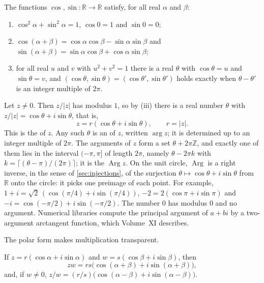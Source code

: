 \begin{assumption}
\label{asm:trig}
The functions $\cos,\sin\colon\mathbb R\to\mathbb R$ satisfy, for all real $\alpha$ and $\beta$:
\begin{enumerate}
\item $\cos^2\alpha+\sin^2\alpha=1$, $\cos0=1$ and $\sin0=0$;
\item $\cos(\alpha+\beta)=\cos\alpha\cos\beta-\sin\alpha\sin\beta$ and $\sin(\alpha+\beta)=\sin\alpha\cos\beta+\cos\alpha\sin\beta$;
\item for all real $u$ and $v$ with $u^2+v^2=1$ there is a real $\theta$ with $\cos\theta=u$ and $\sin\theta=v$, and $(\cos\theta,\sin\theta)=(\cos\theta',\sin\theta')$ holds exactly when $\theta-\theta'$ is an integer multiple of $2\pi$.
\end{enumerate}
\end{assumption}

Let $z\ne0$. Then $z/|z|$ has modulus $1$, so by (iii) there is a real number $\theta$ with $z/|z|=\cos\theta+i\sin\theta$, that is,
\begin{equation}
z=r(\cos\theta+i\sin\theta),\qquad r=|z| .
\label{eq:polar}
\end{equation}
This is the  of $z$. Any such $\theta$ is an  of $z$, written $\arg z$; it is determined up to an integer multiple of $2\pi$. The arguments of $z$ form a set $\theta+2\pi\mathbb Z$, and exactly one of them lies in the interval $(-\pi,\pi]$ of length $2\pi$, namely $\theta-2\pi k$ with $k=\lceil(\theta-\pi)/(2\pi)\rceil$; it is the  $\operatorname{Arg}z$. On the unit circle, $\operatorname{Arg}$ is a right inverse, in the sense of \cref{sec:injections}, of the surjection $\theta\mapsto\cos\theta+i\sin\theta$ from $\mathbb R$ onto the circle: it picks one preimage of each point. For example, $1+i=\sqrt2\,(\cos(\pi/4)+i\sin(\pi/4))$, $-2=2(\cos\pi+i\sin\pi)$ and $-i=\cos(-\pi/2)+i\sin(-\pi/2)$. The number $0$ has modulus $0$ and no argument. Numerical libraries compute the principal argument of $a+bi$ by a two-argument arctangent function, which Volume~XI describes.

The polar form makes multiplication transparent.

\begin{proposition}
\label{prop:polar-mult}
If $z=r(\cos\alpha+i\sin\alpha)$ and $w=s(\cos\beta+i\sin\beta)$, then
\[
zw=rs\bigl(\cos(\alpha+\beta)+i\sin(\alpha+\beta)\bigr),
\]
and, if $w\ne0$, $z/w=(r/s)\bigl(\cos(\alpha-\beta)+i\sin(\alpha-\beta)\bigr)$.
\end{proposition}

